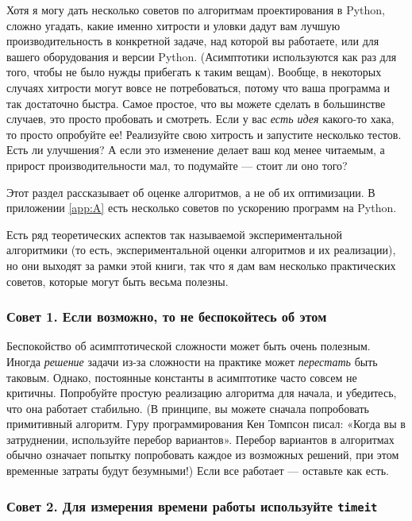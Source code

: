 Хотя я могу дать несколько советов по алгоритмам проектирования в Python, сложно угадать, какие именно хитрости и уловки дадут вам лучшую производительность в конкретной задаче, над которой вы работаете, или для вашего оборудования и версии Python. (Асимптотики используются как раз для того, чтобы не было нужды прибегать к таким вещам). Вообще, в некоторых случаях хитрости могут вовсе не потребоваться, потому что ваша программа и так достаточно быстра. Самое простое, что вы можете сделать в большинстве случаев, это просто пробовать и смотреть. Если у вас \textit{есть идея} какого-то хака, то просто опробуйте ее! Реализуйте свою хитрость и запустите несколько тестов. Есть ли улучшения? А если это изменение делает ваш код менее читаемым, а прирост производительности мал, то подумайте — стоит ли оно того?

\begin{note}
Этот раздел рассказывает об оценке алгоритмов, а не об их оптимизации. В приложении \ref{app:A} есть несколько советов по ускорению программ на Python.
\end{note}

Есть ряд теоретических аспектов так называемой экспериментальной алгоритмики (то есть, экспериментальной оценки алгоритмов и их реализации), но они выходят за рамки этой книги, так что я дам вам несколько практических советов, которые могут быть весьма полезны.

\subsubsection*{Совет 1. Если возможно, то не беспокойтесь об этом}

Беспокойство об асимптотической сложности может быть очень полезным. Иногда \textit{решение} задачи из-за сложности на практике может \textit{перестать} быть таковым. Однако, постоянные константы в асимптотике часто совсем не критичны. Попробуйте простую реализацию алгоритма для начала, и убедитесь, что она работает стабильно. (В принципе, вы можете сначала попробовать примитивный алгоритм. Гуру программирования Кен Томпсон писал: «Когда вы в затруднении, используйте перебор вариантов». Перебор вариантов в алгоритмах обычно означает попытку попробовать каждое из возможных решений, при этом временные затраты будут безумными!) Если все работает — оставьте как есть.

\subsubsection*{Совет 2. Для измерения времени работы используйте \texttt{timeit}}

